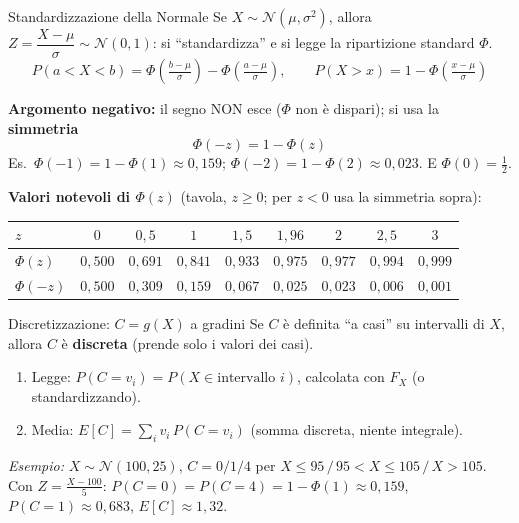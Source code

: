 \documentclass[11pt]{article}
\begin{document}
\begin{concetto}[barGreen]{Standardizzazione della Normale}
Se $X\sim\mathcal{N}(\mu,\sigma^2)$, allora $Z=\dfrac{X-\mu}{\sigma}\sim\mathcal{N}(0,1)$: si ``standardizza'' e si legge la ripartizione standard $\Phi$.
\[ P(a<X<b)=\Phi\!\left(\tfrac{b-\mu}{\sigma}\right)-\Phi\!\left(\tfrac{a-\mu}{\sigma}\right), \qquad P(X>x)=1-\Phi\!\left(\tfrac{x-\mu}{\sigma}\right) \]

\textbf{Argomento negativo:} il segno NON esce ($\Phi$ non \`e dispari); si usa la \textbf{simmetria}
\[ \Phi(-z)=1-\Phi(z) \]
Es.\ $\Phi(-1)=1-\Phi(1)\approx 0{,}159$; \; $\Phi(-2)=1-\Phi(2)\approx 0{,}023$. \quad E $\Phi(0)=\tfrac12$.

\textbf{Valori notevoli di $\Phi(z)$} (tavola, $z\ge0$; per $z<0$ usa la simmetria sopra):
\begin{center}\small
\begin{tabular}{l|cccccccc}
$z$ & $0$ & $0{,}5$ & $1$ & $1{,}5$ & $1{,}96$ & $2$ & $2{,}5$ & $3$ \\
\hline
$\Phi(z)$ & $0{,}500$ & $0{,}691$ & $0{,}841$ & $0{,}933$ & $0{,}975$ & $0{,}977$ & $0{,}994$ & $0{,}999$ \\
$\Phi(-z)$ & $0{,}500$ & $0{,}309$ & $0{,}159$ & $0{,}067$ & $0{,}025$ & $0{,}023$ & $0{,}006$ & $0{,}001$ \\
\end{tabular}
\end{center}
\end{concetto}

\begin{concetto}[barGreen]{Discretizzazione: $C=g(X)$ a gradini}
Se $C$ \`e definita ``a casi'' su intervalli di $X$, allora $C$ \`e \textbf{discreta} (prende solo i valori dei casi).
\begin{enumerate}[leftmargin=1.4em,itemsep=1pt,topsep=2pt]
\item Legge: $P(C=v_i)=P(X\in\text{intervallo }i)$, calcolata con $F_X$ (o standardizzando).
\item Media: $E[C]=\sum_i v_i\,P(C=v_i)$ (somma discreta, niente integrale).
\end{enumerate}
\emph{Esempio:} $X\sim\mathcal{N}(100,25)$, $C=0/1/4$ per $X\le95 \,/\, 95{<}X\le105 \,/\, X{>}105$. Con $Z=\frac{X-100}{5}$: $P(C{=}0)=P(C{=}4)=1-\Phi(1)\approx0{,}159$, $P(C{=}1)\approx0{,}683$, $E[C]\approx1{,}32$.
\end{concetto}
\end{document}
